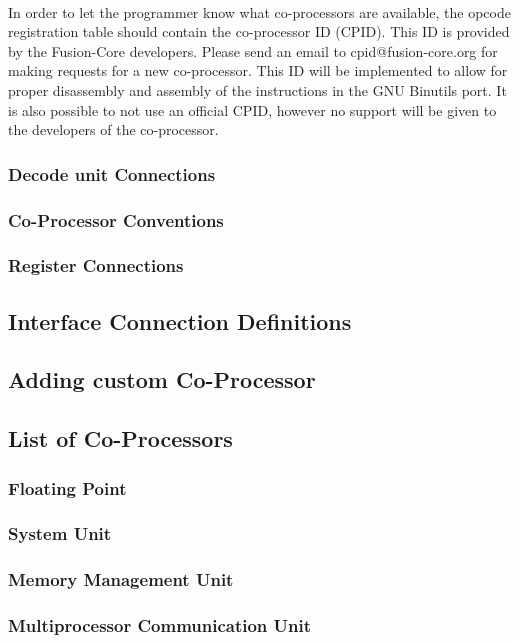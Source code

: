 \documentclass[letterpaper, 11pt]{article}
\begin{document}
\paragraph{} In order to let the programmer know what co-processors are available, the opcode registration table should contain the co-processor ID (CPID).
This ID is provided by the Fusion-Core developers. Please send an email to cpid@fusion-core.org for making requests for a new co-processor.
This ID will be implemented to allow for proper disassembly and assembly of the instructions in the GNU Binutils port. It is also possible to not use an official
CPID, however no support will be given to the developers of the co-processor.

\subsubsection{ Decode unit Connections}
\subsubsection{ Co-Processor Conventions}
\subsubsection{Register Connections}
\subsection{Interface Connection Definitions}
\subsection{Adding custom Co-Processor}
\subsection{List of Co-Processors}
\subsubsection{Floating Point}
\subsubsection{System Unit}
\subsubsection{Memory Management Unit}
\subsubsection{Multiprocessor Communication Unit}
\end{document}
